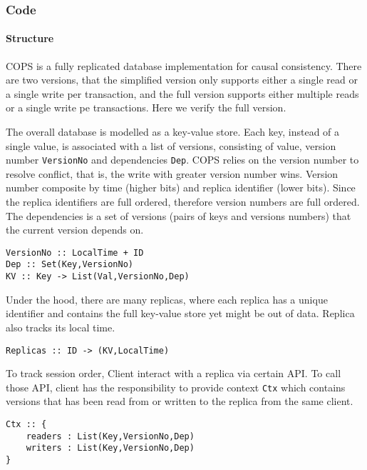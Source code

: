 \subsubsection{Code}
\paragraph{\bf Structure}
COPS is a fully replicated database implementation for causal consistency.
There are two versions, 
that the simplified version only supports either a single read or a single write per transaction, 
and the full version supports either multiple reads or a single write pe transactions.
Here we verify the full version.

The overall database is modelled as a key-value store.
Each key, instead of a single value, is associated with a list of versions,
consisting of value, version number \verb|VersionNo| and dependencies \verb|Dep|.
COPS relies on the version number to resolve conflict,
that is, the write with greater version number wins.
Version number composite by time (higher bits) and replica identifier (lower bits).
Since the replica identifiers are full ordered, therefore version numbers are full ordered.
The dependencies is a set of versions (pairs of keys and versions numbers)
that the current version depends on.

\begin{lstlisting}[caption={COPS Structure},label={lst:cops-structure}]
VersionNo :: LocalTime + ID
Dep :: Set(Key,VersionNo)
KV :: Key -> List(Val,VersionNo,Dep)
\end{lstlisting}

Under the hood, there are many replicas,
where each replica has a unique identifier
and contains the full key-value store yet might be out of data.
Replica also tracks its local time.

\begin{lstlisting}[caption={COPS Replicas},label={lst:cops-replica}]
Replicas :: ID -> (KV,LocalTime)
\end{lstlisting}

To track session order, Client interact with a replica via certain API.
To call those API,
client has the responsibility to provide context \verb|Ctx| 
which contains versions that has been read from or written to the replica from the same client.

\begin{lstlisting}[caption={Client context},label={lst:cops-client-ctx}]
Ctx :: {
    readers : List(Key,VersionNo,Dep)
    writers : List(Key,VersionNo,Dep)
}
\end{lstlisting}

